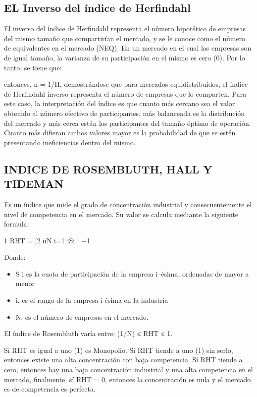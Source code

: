 \documentclass[
  letterpaper,
  DIV=11,
  numbers=noendperiod]{scrartcl}
\begin{document}
\hypertarget{el-inverso-del-uxedndice-de-herfindahl}{%
\subsection{EL Inverso del índice de
Herfindahl}\label{el-inverso-del-uxedndice-de-herfindahl}}

El inverso del índice de Herfindahl representa el número hipotético de
empresas del mismo tamaño que compartirían el mercado, y se le conoce
como el número de equivalentes en el mercado (NEQ). En un mercado en el
cual las empresas son de igual tamaño, la varianza de su participación
en el mismo es cero (0). Por lo tanto, se tiene que:

entonces, n = 1/H, demostrándose que para mercados equidistribuidos, el
índice de Herfindahl inverso representa el número de empresas que lo
comparten. Para este caso, la interpretación del índice es que cuanto
más cercano sea el valor obtenido al número efectivo de participantes,
más balanceada es la distribución del mercado y más cerca están los
participantes del tamaño óptimo de operación. Cuanto más difieran ambos
valores mayor es la probabilidad de que se estén presentando
ineficiencias dentro del mismo.

\hypertarget{indice-de-rosembluth-hall-y-tideman}{%
\subsection{INDICE DE ROSEMBLUTH, HALL Y
TIDEMAN}\label{indice-de-rosembluth-hall-y-tideman}}

Es un índice que mide el grado de concentración industrial y
consecuentemente el nivel de competencia en el mercado. Su valor se
calcula mediante la siguiente formula:

1 RHT = {[}2 σN i=1 iSi {]} −1

Donde:

\begin{itemize}
\item
  S i es la cuota de participación de la empresa i--ésima, ordenadas de
  mayor a menor
\item
  i, es el rango de la empresa i-ésima en la industria
\item
  N, es el número de empresas en el mercado.
\end{itemize}

El índice de Rosembluth varía entre: (1/N) ≤ RHT ≤ 1.

Sí RHT es igual a uno (1) es Monopolio. Si RHT tiende a uno (1) sin
serlo, entonces existe una alta concentración con baja competencia. Sí
RHT tiende a cero, entonces hay una baja concentración industrial y una
alta competencia en el mercado, finalmente, sí RHT = 0, entonces la
concentración es nula y el mercado es de competencia es perfecta.
\end{document}
